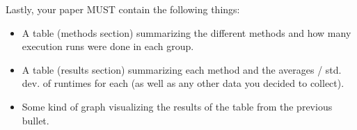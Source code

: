 \documentclass[paper=a4, fontsize=11pt, parskip=full]{scrartcl} %
\numberwithin{equation}{section} %
\numberwithin{figure}{section} %
\numberwithin{table}{section} %
\begin{document}
Lastly, your paper MUST contain the following things:

\begin{itemize}
	\item A table (methods section) summarizing the different methods and how many execution runs were done in each group.
	\item A table (results section) summarizing each method and the averages / std. dev. of runtimes for each (as well as any other data you decided to collect).
	\item Some kind of graph visualizing the results of the table from the previous bullet.
\end{itemize}


\end{document}
